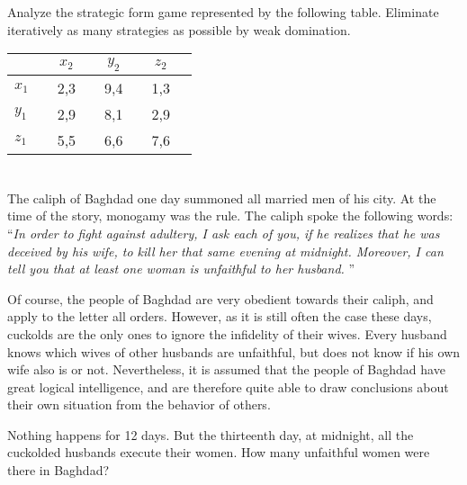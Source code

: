 \documentclass{../ape}
\begin{document}

\section{}
Analyze the strategic form game represented by the following table. Eliminate iteratively as many strategies as possible by weak domination.
\begin{center}
	\begin{tabular}[h!]{l|ccccccc}
		&& $x_2$ && $y_2$ && $z_2$ \\
		\hline
		$x_1$ && 2,3 && 9,4 && 1,3 & \\
		$y_1$ && 2,9 && 8,1 && 2,9 & \\
		$z_1$ && 5,5 && 6,6 && 7,6 &
	\end{tabular} 
\end{center}

\begin{solution}

\end{solution}

\section{}
The caliph of Baghdad one day summoned all married men of his city. At the time of the story, monogamy was the rule. The caliph spoke the following words: ``\textit{In order to fight against adultery, I ask each of you, if he realizes that he was deceived by his wife, to kill her that same evening at midnight. Moreover, I can tell you that at least one woman is unfaithful to her husband.} ''

Of course, the people of Baghdad are very obedient towards their caliph, and apply to the letter all orders. However, as it is still often the case these days, cuckolds are the only ones to ignore the infidelity of their wives. Every husband knows which wives of other husbands are unfaithful, but does not know if his own wife also is or not. Nevertheless, it is assumed that the people of Baghdad have great logical intelligence, and are therefore quite able to draw conclusions about their own situation from the behavior of others.

Nothing happens for 12 days. But the thirteenth day, at midnight, all the cuckolded husbands execute their women. How many unfaithful women were there in Baghdad?
\begin{solution}

\end{solution}
\end{document}
